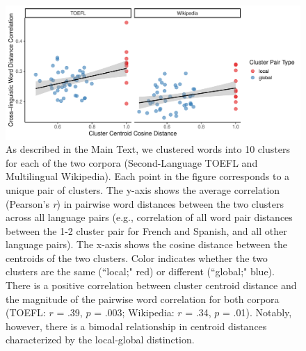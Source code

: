 \documentclass[9pt,twoside,lineno]{pnas-new}
\begin{document}
\pagebreak

\clearpage


\begin{figure}[h]
\centering
\includegraphics[width = 6.3in]{suppfigs/continuous_semantic_clusters.pdf}
   \caption{As described in the Main Text, we clustered words into 10 clusters for each of the two corpora (Second-Language TOEFL and Multilingual Wikipedia). Each point in the figure corresponds to a unique pair of clusters. The y-axis shows the average correlation (Pearson's {\it r}) in pairwise word distances between the two clusters across all language pairs (e.g., correlation of all word pair distances between the 1-2 cluster pair for French and Spanish, and all other language pairs). The x-axis shows the cosine distance between the centroids of the two clusters. Color indicates whether the two clusters are the same  (``local;" red) or different (``global;" blue). There is a positive correlation between cluster centroid distance and the magnitude of the pairwise word correlation for both corpora (TOEFL: $r$ = .39, $p$ = .003; Wikipedia: $r$ = .34, $p$ = .01). Notably, however, there is a bimodal relationship in centroid distances characterized by the local-global distinction.}
\end{figure}


\pagebreak
\clearpage





\end{document}
